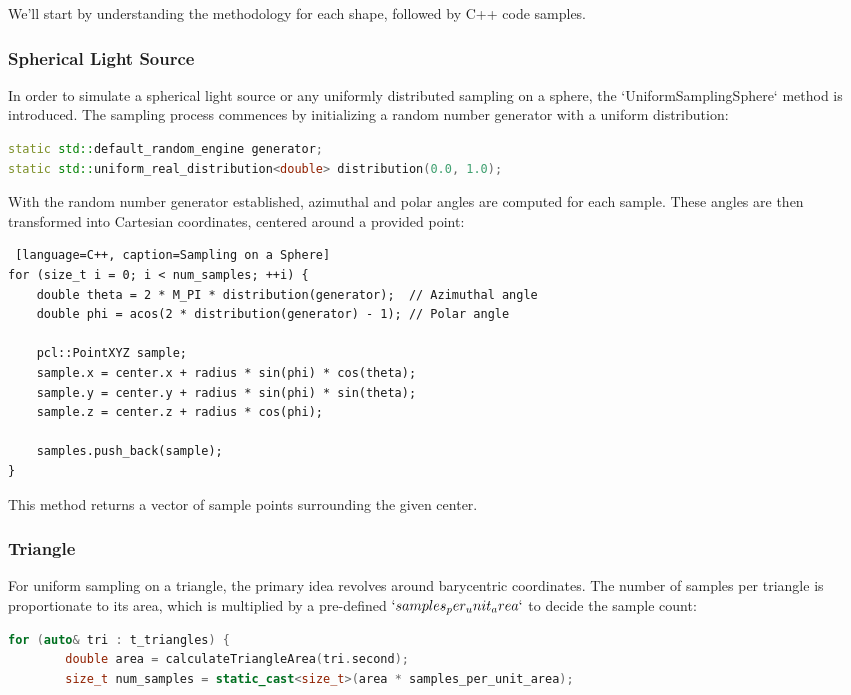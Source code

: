 \documentclass[11pt, a4paper,oneside,chapterprefix=false]{scrbook}
\begin{document}
We'll start by understanding the methodology for each shape, followed by C++ code samples.

\subsubsection{Spherical Light Source}

In order to simulate a spherical light source or any uniformly distributed sampling on a sphere, the `UniformSamplingSphere` method is introduced. The sampling process commences by initializing a random number generator with a uniform distribution:

\begin{lstlisting}[language=C++, caption=Spherical Sampling Initialization]
static std::default_random_engine generator;
static std::uniform_real_distribution<double> distribution(0.0, 1.0);
\end{lstlisting}

With the random number generator established, azimuthal and polar angles are computed for each sample. These angles are then transformed into Cartesian coordinates, centered around a provided point:

\begin{lstlisting} [language=C++, caption=Sampling on a Sphere]
for (size_t i = 0; i < num_samples; ++i) {
	double theta = 2 * M_PI * distribution(generator);  // Azimuthal angle
	double phi = acos(2 * distribution(generator) - 1); // Polar angle

	pcl::PointXYZ sample;
	sample.x = center.x + radius * sin(phi) * cos(theta);
	sample.y = center.y + radius * sin(phi) * sin(theta);
	sample.z = center.z + radius * cos(phi);

	samples.push_back(sample);
}
\end{lstlisting}

This method returns a vector of sample points surrounding the given center.

\subsubsection{Triangle}

For uniform sampling on a triangle, the primary idea revolves around barycentric coordinates. The number of samples per triangle is proportionate to its area, which is multiplied by a pre-defined $`samples_per_unit_area`$ to decide the sample count:

\begin{lstlisting}[language=C++, caption=Triangle Sampling Initialization]
    for (auto& tri : t_triangles) {
        double area = calculateTriangleArea(tri.second);
        size_t num_samples = static_cast<size_t>(area * samples_per_unit_area);
\end{lstlisting}
\end{document}
